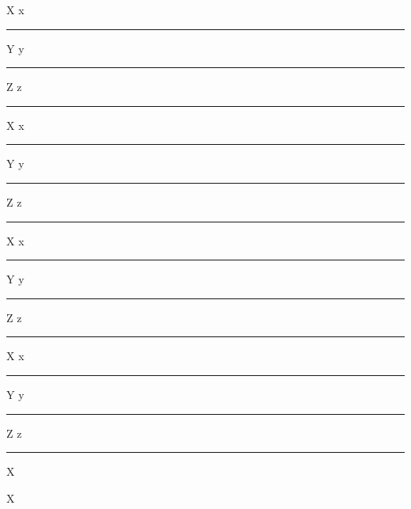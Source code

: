 \documentclass{minimal}
\begin{document}
	\noindent
X\kern500000sp x\rule{500000sp}{500000sp}%
Y\kern500000sp y\rule[-250000sp]{500000sp}{500000sp}%
Z\kern500000sp z\rule[250000sp]{500000sp}{500000sp}%
X\kern1000000sp x\rule{-500000sp}{500000sp}%
Y\kern1000000sp y\rule[-250000sp]{-500000sp}{500000sp}%
Z\kern1000000sp z\rule[250000sp]{-500000sp}{500000sp}%
X\kern1000000sp x\rule{-500000sp}{-500000sp}%
Y\kern1000000sp y\rule[-250000sp]{-500000sp}{-500000sp}%
Z\kern1000000sp z\rule[250000sp]{-500000sp}{-500000sp}%
X\kern500000sp x\rule{500000sp}{-500000sp}%
Y\kern500000sp y\rule[-250000sp]{500000sp}{-500000sp}%
Z\kern500000sp z\rule[250000sp]{500000sp}{-500000sp}%
X

X
\end{document}
